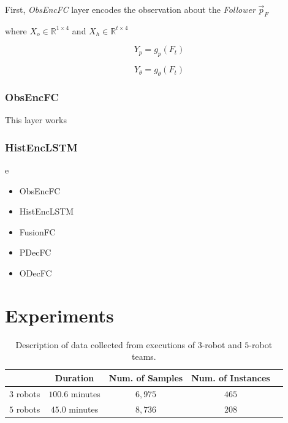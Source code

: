\documentclass[letterpaper, 10 pt, conference]{ieeeconf}  %
\begin{document}
	First, \emph{ObsEncFC} layer encodes the observation about the \emph{Follower} $\vec{p}_{F}$
	
	
	where $X_o \in \mathbb{R}^{1 \times 4}$ and $X_h \in \mathbb{R}^{t \times 4}$
	
	\begin{equation}
	Y_p = g_{p}(F_t)
	\end{equation}

	\begin{equation}
	Y_\theta = g_{\theta}(F_t)
	\end{equation}

	
	
	\subsubsection{ObsEncFC}
	This layer works 
	
	\subsubsection{HistEncLSTM}
	e	
		
	\begin{itemize}
		\item ObsEncFC
		\item HistEncLSTM
		\item FusionFC
		\item PDecFC
		\item ODecFC
	\end{itemize}
	
	
	
	\section{Experiments} 
	\label{sec:experiments} 
	
	\setlength{\tabcolsep}{0.5em} %
	{\renewcommand{\arraystretch}{1.2}%
		\begin{table}[t]
			\label{table:data_description}
			\centering
			\begin{tabular}{|c|c|c|c|c|}
				\hline
							&  Duration & Num. of Samples & Num. of Instances  \\ \hline
				$3$ robots & $100.6$ minutes & $6,975$ & $465$  \\ \hline
				$5$ robots & $45.0$ minutes  & $8,736$ & $208$  \\ \hline
			\end{tabular}
			\caption{Description of data collected from executions of $3$-robot and $5$-robot teams.}
		\end{table}
	}	
	
\end{document}

